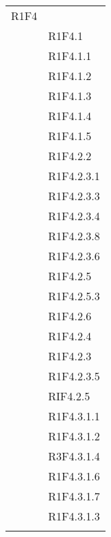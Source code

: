\begin{center}
\begin{longtable}{|p{7cm}|p{7cm}|}
R1F4 \\ & R1F4.1 \\ & R1F4.1.1 \\ & R1F4.1.2 \\ & R1F4.1.3 \\ & R1F4.1.4 \\ & R1F4.1.5 \\ & R1F4.2.2 \\ & R1F4.2.3.1 \\ & R1F4.2.3.3 \\ & R1F4.2.3.4 \\ & R1F4.2.3.8 \\ & R1F4.2.3.6 \\ & R1F4.2.5 \\ & R1F4.2.5.3 \\ & R1F4.2.6 \\ & R1F4.2.4 \\ & R1F4.2.3 \\ & R1F4.2.3.5 \\ & RIF4.2.5 \\ & R1F4.3.1.1 \\ & R1F4.3.1.2 \\ & R3F4.3.1.4 \\ & R1F4.3.1.6 \\ & R1F4.3.1.7 \\ & R1F4.3.1.3 \\ & \\ \hline

\end{longtable}
\end{center}
